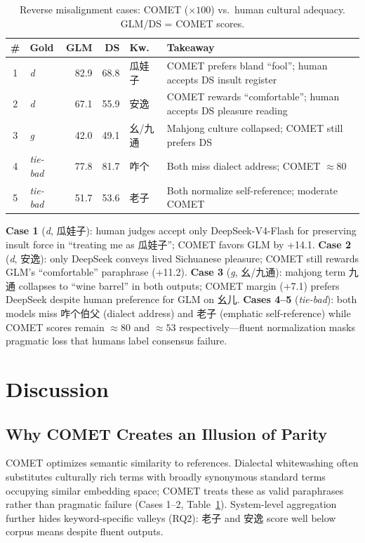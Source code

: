 \documentclass[11pt]{article}
\begin{document}
\begin{table}[t]
  \centering
  \footnotesize
  \setlength{\tabcolsep}{3pt}
  \begin{tabular}{@{}clrrlp{4.8cm}@{}}
    \toprule
    \textbf{\#} & \textbf{Gold} & \textbf{GLM} & \textbf{DS} & \textbf{Kw.} & \textbf{Takeaway} \\
    \midrule
    1 & \emph{d} & 82.9 & 68.8 & 瓜娃子 & COMET prefers bland ``fool''; human accepts DS insult register \\
    2 & \emph{d} & 67.1 & 55.9 & 安逸 & COMET rewards ``comfortable''; human accepts DS pleasure reading \\
    3 & \emph{g} & 42.0 & 49.1 & 幺/九通 & Mahjong culture collapsed; COMET still prefers DS \\
    4 & \emph{tie-bad} & 77.8 & 81.7 & 咋个 & Both miss dialect address; COMET ${\approx}80$ \\
    5 & \emph{tie-bad} & 51.7 & 53.6 & 老子 & Both normalize self-reference; moderate COMET \\
    \bottomrule
  \end{tabular}
  \caption{Reverse misalignment cases: COMET ($\times 100$) vs.\ human cultural adequacy. GLM/DS = COMET scores.}
  \label{tab:reverse}
\end{table}

\noindent\textbf{Case 1} (\emph{d}, 瓜娃子): human judges accept only DeepSeek-V4-Flash for preserving insult force in ``treating me as 瓜娃子''; COMET favors GLM by +14.1.
\textbf{Case 2} (\emph{d}, 安逸): only DeepSeek conveys lived Sichuanese pleasure; COMET still rewards GLM's ``comfortable'' paraphrase (+11.2).
\textbf{Case 3} (\emph{g}, 幺/九通): mahjong term 九通 collapses to ``wine barrel'' in both outputs; COMET margin (+7.1) prefers DeepSeek despite human preference for GLM on 幺儿.
\textbf{Cases 4--5} (\emph{tie-bad}): both models miss 咋个伯父 (dialect address) and 老子 (emphatic self-reference) while COMET scores remain ${\approx}80$ and ${\approx}53$ respectively---fluent normalization masks pragmatic loss that humans label consensus failure.

\section{Discussion}

\subsection{Why COMET Creates an Illusion of Parity}
COMET optimizes semantic similarity to references.
Dialectal whitewashing often substitutes culturally rich terms with broadly synonymous standard terms occupying similar embedding space; COMET treats these as valid paraphrases rather than pragmatic failure (Cases 1--2, Table~\ref{tab:reverse}).
System-level aggregation further hides keyword-specific valleys (RQ2): 老子 and 安逸 score well below corpus means despite fluent outputs.
\end{document}
